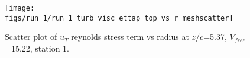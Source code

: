 \begin{figure}[H]
\centering
\texttt{[image: figs/run\_1/run\_1\_turb\_visc\_ettap\_top\_vs\_r\_meshscatter]}
\caption{Scatter plot of $
u_T$ reynolds stress term vs radius at $z/c$=5.37, $V_{free}$=15.22, station 1.}
\label{fig:run_1_turb_visc_ettap_top_vs_r_meshscatter}
\end{figure}


